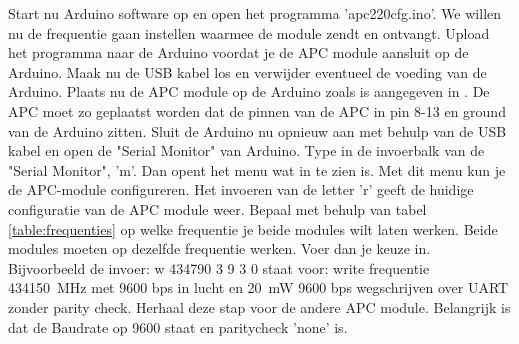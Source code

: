 Start nu Arduino software op en open het programma 'apc220cfg.ino'. We
willen nu de frequentie gaan instellen waarmee de module zendt en
ontvangt. Upload het programma naar de Arduino voordat je de APC module
aansluit op de Arduino. Maak nu de USB kabel los en verwijder eventueel
de voeding van de Arduino. Plaats nu de APC module op de Arduino zoals
is aangegeven in . De APC moet zo
geplaatst worden dat de pinnen van de APC in pin 8-13 en ground van de
Arduino zitten. Sluit de Arduino nu opnieuw aan met behulp van de USB
kabel en open de "Serial Monitor" van Arduino. Type in de invoerbalk van
de "Serial Monitor", 'm'. Dan opent het menu wat in
 te zien is. Met dit menu kun je de APC-module
configureren. Het invoeren van de letter 'r' geeft de huidige
configuratie van de APC module weer. Bepaal met behulp van tabel
\ref{table:frequenties} op welke frequentie je beide modules wilt laten
werken. Beide modules moeten op dezelfde frequentie werken. Voer dan je
keuze in. Bijvoorbeeld de invoer: w 434790 3 9 3 0 staat voor: write
frequentie \SI{434150}{\MHz} met 9600 bps in lucht en
\SI{20}{\milli\watt} 9600 bps wegschrijven over UART zonder parity check.
Herhaal deze stap voor de andere APC module. Belangrijk is dat de Baudrate op 
9600 staat en paritycheck 'none' is.



